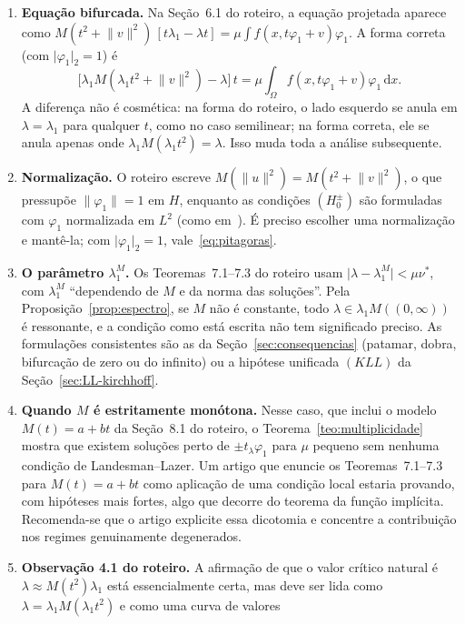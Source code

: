 \documentclass[11pt,a4paper]{article}
\theoremstyle{plain}
\theoremstyle{definition}
\theoremstyle{remark}
\newcommand{\norm}[1]{\lVert #1\rVert}
\newcommand{\abs}[1]{\lvert #1\rvert}
\newcommand{\dx}{\,\mathrm{d}x}
\begin{document}
\begin{enumerate}[label=\textbf{(\arabic*)},leftmargin=2.2em]
\item \textbf{Equação bifurcada.} Na Seção~6.1 do roteiro, a equação projetada
aparece como
$M(t^2+\norm{v}^2)\,[t\lambda_1-\lambda t]=\mu\int f(x,t\varphi_1+v)\varphi_1$.
A forma correta (com $\abs{\varphi_1}_2=1$) é
\[
\bigl[\lambda_1M(\lambda_1t^2+\norm{v}^2)-\lambda\bigr]\,t=\mu\int_\Omega f(x,t\varphi_1+v)\varphi_1\dx .
\]
A diferença não é cosmética: na forma do roteiro, o lado esquerdo se anula em
$\lambda=\lambda_1$ para qualquer $t$, como no caso semilinear; na forma
correta, ele se anula apenas onde $\lambda_1M(\lambda_1t^2)=\lambda$. Isso muda
toda a análise subsequente.
\item \textbf{Normalização.} O roteiro escreve $M(\norm{u}^2)=M(t^2+\norm{v}^2)$,
o que pressupõe $\norm{\varphi_1}=1$ em $H$, enquanto as condições $(H_0^\pm)$
são formuladas com $\varphi_1$ normalizada em $L^2$ (como
em~\cite{RezendeSanchezSilva2019}). É preciso escolher uma normalização e
mantê-la; com $\abs{\varphi_1}_2=1$, vale~\eqref{eq:pitagoras}.
\item \textbf{O parâmetro $\lambda_1^M$.} Os Teoremas~7.1--7.3 do roteiro usam
$\abs{\lambda-\lambda_1^M}<\mu\nu^*$, com $\lambda_1^M$ ``dependendo de $M$ e da
norma das soluções''. Pela Proposição~\ref{prop:espectro}, se $M$ não é
constante, todo $\lambda\in\lambda_1M((0,\infty))$ é ressonante, e a condição
como está escrita não tem significado preciso. As formulações consistentes são
as da Seção~\ref{sec:consequencias} (patamar, dobra, bifurcação de zero ou do
infinito) ou a hipótese unificada $(KLL)$ da Seção~\ref{sec:LL-kirchhoff}.
\item \textbf{Quando $M$ é estritamente monótona.} Nesse caso, que inclui o
modelo $M(t)=a+bt$ da Seção~8.1 do roteiro, o Teorema~\ref{teo:multiplicidade}
mostra que existem soluções perto de $\pm t_\lambda\varphi_1$ para $\mu$ pequeno
sem nenhuma condição de Landesman--Lazer. Um artigo que enuncie os
Teoremas~7.1--7.3 para $M(t)=a+bt$ como aplicação de uma condição local estaria
provando, com hipóteses mais fortes, algo que decorre do teorema da função
implícita. Recomenda-se que o artigo explicite essa dicotomia e concentre a
contribuição nos regimes genuinamente degenerados.
\item \textbf{Observação 4.1 do roteiro.} A afirmação de que o valor crítico
natural é $\lambda\approx M(t^2)\lambda_1$ está essencialmente certa, mas deve
ser lida como $\lambda=\lambda_1M(\lambda_1t^2)$ e como uma curva de valores

\end{enumerate}
\end{document}
